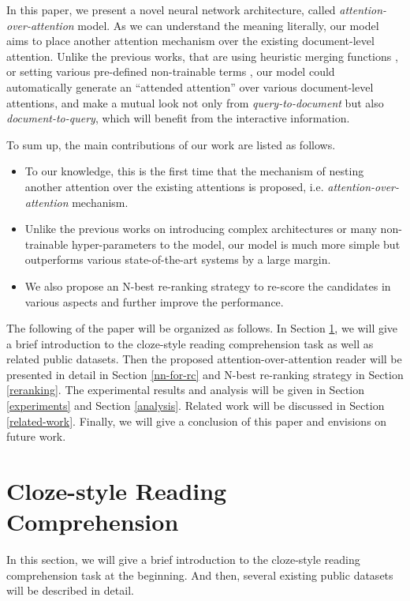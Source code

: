 \documentclass[11pt,a4paper]{article}
\begin{document}
In this paper, we present a novel neural network architecture, called {\em attention-over-attention} model. 
As we can understand the meaning literally, our model aims to place another attention mechanism over the existing document-level attention.
Unlike the previous works, that are using heuristic merging functions \cite{cui-etal-2016}, or setting various pre-defined non-trainable terms \cite{trischler-etal-2016}, our model could automatically generate an ``attended attention'' over various document-level attentions, and make a mutual look not only from {\em query-to-document} but also {\em document-to-query}, which will benefit from the interactive information. 

To sum up, the main contributions of our work are listed as follows.
\begin{itemize}
	\item To our knowledge, this is the first time that the mechanism of nesting another attention over the existing attentions is proposed, i.e. {\em attention-over-attention} mechanism.
	\item Unlike the previous works on introducing complex architectures or many non-trainable hyper-parameters to the model, our model is much more simple but outperforms various state-of-the-art systems by a large margin.
	\item We also propose an N-best re-ranking strategy to re-score the candidates in various aspects and further improve the performance.
\end{itemize}

The following of the paper will be organized as follows.
In Section \ref{rc-task}, we will give a brief introduction to the cloze-style reading comprehension task as well as related public datasets. 
Then the proposed attention-over-attention reader will be presented in detail in Section \ref{nn-for-rc} and N-best re-ranking strategy in Section \ref{reranking}.
The experimental results and analysis will be given in Section \ref{experiments} and Section \ref{analysis}.
Related work will be discussed in Section \ref{related-work}.
Finally, we will give a conclusion of this paper and envisions on future work.


\section{Cloze-style Reading Comprehension}\label{rc-task}
In this section, we will give a brief introduction to the cloze-style reading comprehension task at the beginning. 
And then, several existing public datasets will be described in detail.
\end{document}
